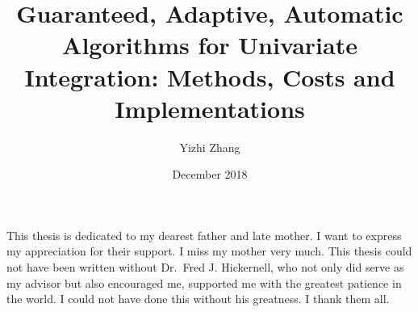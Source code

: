 \documentclass{iitthesis}
\theoremstyle{definition}
\theoremstyle{remark}
\begin{document}
\title{Guaranteed, Adaptive, Automatic Algorithms for Univariate Integration: Methods, Costs and Implementations}
\author{Yizhi Zhang}
\date{December 2018}
\copyrightnoticefalse      %
\maketitle                %


\prelimpages         %


\begin{acknowledgement}     %
\par  This thesis is dedicated to my dearest father and late mother. I want to express my appreciation for their support. I miss my mother very much. This thesis could not have been written without Dr.\ Fred J. Hickernell, who not only did serve as my advisor but also encouraged me, supported me with the greatest patience in the world. I could not have done this without his greatness. I thank them all.
\end{acknowledgement}


\tableofcontents
\clearpage

\listoftables

\clearpage

\listoffigures

\clearpage
%
%
%
\end{document}
